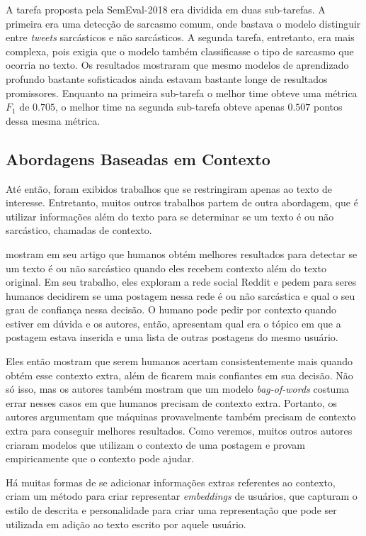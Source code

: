 A tarefa proposta pela SemEval-2018 era dividida em duas sub-tarefas. A primeira
era uma detecção de sarcasmo comum, onde bastava o modelo distinguir entre
\textit{tweets} sarcásticos e não sarcásticos. A segunda tarefa, entretanto, era
mais complexa, pois exigia que o modelo também classificasse o tipo de sarcasmo
que ocorria no texto. Os resultados mostraram que mesmo modelos de aprendizado
profundo bastante sofisticados ainda estavam bastante longe de resultados
promissores. Enquanto na primeira sub-tarefa o melhor time obteve uma métrica
$F_1$ de $0.705$, o melhor time na segunda sub-tarefa obteve apenas $0.507$
pontos dessa mesma métrica.

\subsection{Abordagens Baseadas em Contexto}%
\label{sub:abordagens_baseadas_em_contexto}

Até então, foram exibidos trabalhos que se restringiram apenas ao texto de
interesse. Entretanto, muitos outros trabalhos partem de outra abordagem, que é
utilizar informações além do texto para se determinar se um texto é ou não
sarcástico, chamadas de contexto.

\cite{wallace-etal:2014:ironic-context} mostram em seu artigo que humanos obtém
melhores resultados para detectar se um texto é ou não sarcástico quando eles
recebem contexto além do texto original. Em seu trabalho, eles exploram a rede
social Reddit e pedem para seres humanos decidirem se uma postagem nessa rede é
ou não sarcástica e qual o seu grau de confiança nessa decisão. O humano pode
pedir por contexto quando estiver em dúvida e os autores, então, apresentam qual
era o tópico em que a postagem estava inserida e uma lista de outras postagens
do mesmo usuário.

Eles então mostram que serem humanos acertam consistentemente mais quando obtém
esse contexto extra, além de ficarem mais confiantes em sua decisão. Não só
isso, mas os autores também mostram que um modelo \textit{bag-of-words} costuma
errar nesses casos em que humanos precisam de contexto extra. Portanto, os
autores argumentam que máquinas provavelmente também precisam de contexto extra
para conseguir melhores resultados. Como veremos, muitos outros autores criaram
modelos que utilizam o contexto de uma postagem e provam empiricamente que o
contexto pode ajudar.

Há muitas formas de se adicionar informações extras referentes ao contexto,
\cite{hazarika-etal:2018:cascade} criam um método para criar representar
\textit{embeddings} de usuários, que capturam o estilo de descrita e
personalidade para criar uma representação que pode ser utilizada em adição ao
texto escrito por aquele usuário.

